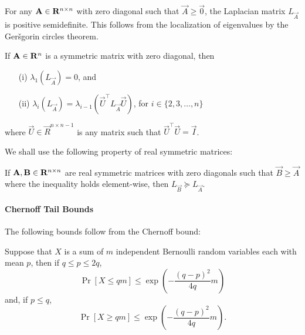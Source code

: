 For any $\mathbf{A}\in \mathbf{R}^{n\times n}$ with zero diagonal such that $\vec{A}\geq \vec{0}$, the Laplacian matrix $L_{\vec{A}}$ is positive semidefinite. This follows from the localization of eigenvalues by the Ger\v sgorin circles theorem. 

\begin{lemma} If $\mathbf{A}\in \mathbf{R}^n$ is a symmetric matrix with zero diagonal, then
\begin{enumerate}
\item [(i)] $\lambda_1(L_{\vec{A}}) = 0$, and
\item [(ii)] $\lambda_i(L_{\vec{A}}) = \lambda_{i-1}(\vec{U}^\top L_{\vec{A}} \vec{U})$, for $i\in \{2,3,\ldots,n\}$
\end{enumerate}
where $\vec{U}\in \vec{R}^{n\times n-1}$ is any matrix such that $\vec{U}^\top \vec{U} = \vec{I}$.
\label{lem:Leig}
\end{lemma}

We shall use the following property of real symmetric matrices:

\begin{lemma} If $\mathbf{A},\mathbf{B}\in \mathbf{R}^{n\times n}$ are real symmetric matrices with zero diagonals such that $\vec{B} \geq \vec{A}$ where the inequality holds element-wise, then $L_{\vec{B}} \succeq L_{\vec{A}}$. 
\label{lem:laplaceposdef}
\end{lemma}

\paragraph{Chernoff Tail Bounds} The following bounds follow from the Chernoff bound:

\begin{lemma} Suppose that $X$ is a sum of $m$ independent Bernoulli random variables each with mean $p$, then if $q \leq p \leq 2q$,
\begin{equation}
\Pr[X \leq q m] \leq \exp\left(-\frac{(q-p)^2}{4q} m\right)
\label{equ:che1}
\end{equation}
and, if $p \leq q$, 
\begin{equation}
\Pr[X \geq q m] \leq \exp\left(-\frac{(q-p)^2}{4q} m\right).
\label{equ:che2}
\end{equation}
\label{lem:chernoff}
\end{lemma}

